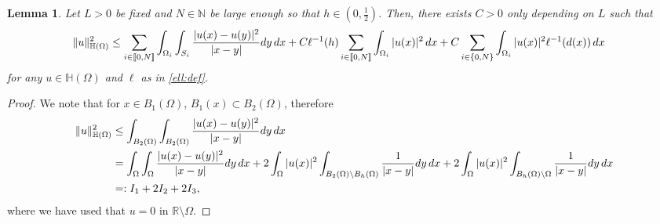 \documentclass[11 pt]{article}
\newcommand\inter[1]{\llbracket #1\rrbracket}
\newtheorem{lemma}[theorem]{Lemma}
\numberwithin{equation}{section}
\def\R{\mathbb{R}}
\begin{document}
\begin{lemma}\label{lem:localization_enorm}
Let $L>0$ be fixed and $N\in\mathbb N$ be large enough so that $h\in(0,\frac{1}{2})$. Then, there exists $C>0$ only depending on $L$ such that
%
   \begin{align*}\notag
    \|u\|^2_{\mathbb H(\Omega)} &\leq \sum_{i\in\inter{0,N}}\int_{\Omega_i}\int_{S_i}\frac{|u(x)-u(y)|^2}{|x-y|}dy\,dx+C\ell^{-1}(h)\sum_{i\in\inter{0,N}}\int_{\Omega_i}|u(x)|^2\,dx +C\sum_{i\in\{0,N\}}\int_{\Omega_i}|u(x)|^2\ell^{-1}(d(x))\,dx
\end{align*}
%
for any $u\in \mathbb{H}(\Omega)$ and $\ell$ as in \eqref{ell:def}.
\end{lemma}
\begin{proof}
We note that for $x\in B_1(\Omega)$, $B_1(x)\subset B_2(\Omega)$, therefore
%
\begin{align}\notag
    \|u\|_{\mathbb H(\Omega)}^2&\leq \int_{B_2(\Omega)}\int_{B_2(\Omega)}\frac{|u(x)-u(y)|^2}{|x-y|}dy\, dx\\ \notag
    &=\int_{\Omega}\int_{\Omega}\frac{|u(x)-u(y)|^2}{|x-y|}dy\,dx+2\int_{\Omega}|u(x)|^2\int_{B_2(\Omega)\setminus B_h(\Omega)}\frac{1}{|x-y|}dy\,dx+2\int_{\Omega}|u(x)|^2\int_{B_h(\Omega)\setminus \Omega}\frac{1}{|x-y|}dy\,dx\\ &=: I_1+2I_2+2I_3,\label{eq:part_init}
\end{align}
%
where we have used that $u=0$ in $\R\setminus \Omega$. 


\end{proof}
\end{document}
